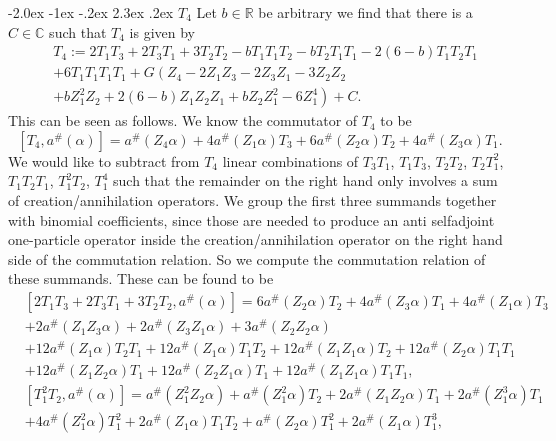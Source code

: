 \documentclass[oneside,reqno,12pt]{amsart}
\makeatletter
\renewcommand\section{\@startsection {section}{1}{\z@}%
                                   {-2.0ex \@plus -1ex \@minus -.2ex}%
                                   {2.3ex \@plus.2ex}%
                                   {\normalfont\Large\bfseries}}
\makeatother
\begin{document}
 \section{\(T_4\)}
Let \(b \in\mathbb{R}\) be arbitrary we find that there is a \(C\in\mathbb{C}\) such that \(T_4\) is given by
\begin{align}\tag*{}
&T_4:= 2 T_1T_3 + 2 T_3 T_1 + 3 T_2 T_2 - b T_1 T_1 T_2 - b T_2 T_1 T_1 - 2 ( 6-b) T_1 T_2 T_1 \\\label{explicitT4}
&+ 6 T_1 T_1 T_1 T_1+G\left(Z_4-2Z_1Z_3-2Z_3Z_1-3Z_2Z_2\right.\\\tag*{}
&\left.+bZ_1^2Z_2+2(6-b)Z_1Z_2Z_1+bZ_2Z_1^2-6Z_1^4 \right)  + C
.\end{align}
This can be seen as follows. We know the commutator of \(T_4\) to be
\begin{equation}
\left[ T_4 , a^\# (\alpha) \right]
=a^\# \left( Z_4 \alpha\right) + 4 a^\# \left( Z_1\alpha\right) T_3 + 6 a^\#\left( Z_2\alpha\right) T_2 + 4 a^\# \left( Z_3 \alpha\right) T_1.
\end{equation}
We would like to subtract from \(T_4\) linear combinations of  \(T_3T_1\), \(T_1T_3\), \(T_2T_2\), \(T_2T_1^2\), \(T_1T_2T_1\), \(T_1^2T_2\), \(T_1^4\) such that the remainder on the right hand only involves a sum of creation/annihilation operators. We group the first three summands together with binomial coefficients, since those are needed to produce an anti selfadjoint one-particle operator inside the creation/annihilation operator on the right hand side of the commutation relation. So we compute the commutation relation of these summands. These can be found to be
\begin{align}\tag*{}
&\left[ 2 T_1 T_3 + 2 T_3 T_1 + 3 T_2 T_2 ,a^\#(\alpha)\right] = 6 a^\#\left( Z_2 \alpha\right)T_2 + 4 a^\#\left(Z_3 \alpha\right) T_1 + 4 a^\#\left( Z_1\alpha\right) T_3\\\tag*{}
&+2 a^\#\left(Z_1 Z_3 \alpha \right)  + 2 a^\#\left(Z_3 Z_1 \alpha \right) +3 a^\#\left(Z_2 Z_2 \alpha \right) \\\tag*{}
&+12 a^\#\left(Z_1 \alpha\right) T_2 T_1+12 a^\#\left(Z_1 \alpha\right) T_1 T_2
+12 a^\#\left(Z_1Z_1 \alpha\right) T_2+12 a^\#\left(Z_2 \alpha\right) T_1T_1\\
&+12 a^\#\left(Z_1Z_2 \alpha\right) T_1+12 a^\#\left(Z_2Z_1 \alpha\right) T_1
+12 a^\#\left(Z_1Z_1 \alpha\right) T_1T_1
,\end{align}
\begin{align}\tag*{}
&\left[T_1^2 T_2, a^\#(\alpha)\right]= a^\#\left(Z_1^2 Z_2 \alpha\right) 
+a^\#\left(Z_1^2 \alpha\right)T_2+2 a^\#\left(Z_1 Z_2 \alpha\right)T_1
+2 a^\#\left(Z_1^3 \alpha\right)T_1\\
&+4 a^\#\left(Z_1^2 \alpha\right)T_1^2 
+2 a^\#\left(Z_1  \alpha\right)T_1T_2+ a^\#\left(Z_2 \alpha\right)T_1^2
+ 2 a^\#\left(Z_1 \alpha\right)T_1^3
,\end{align}
\end{document}
